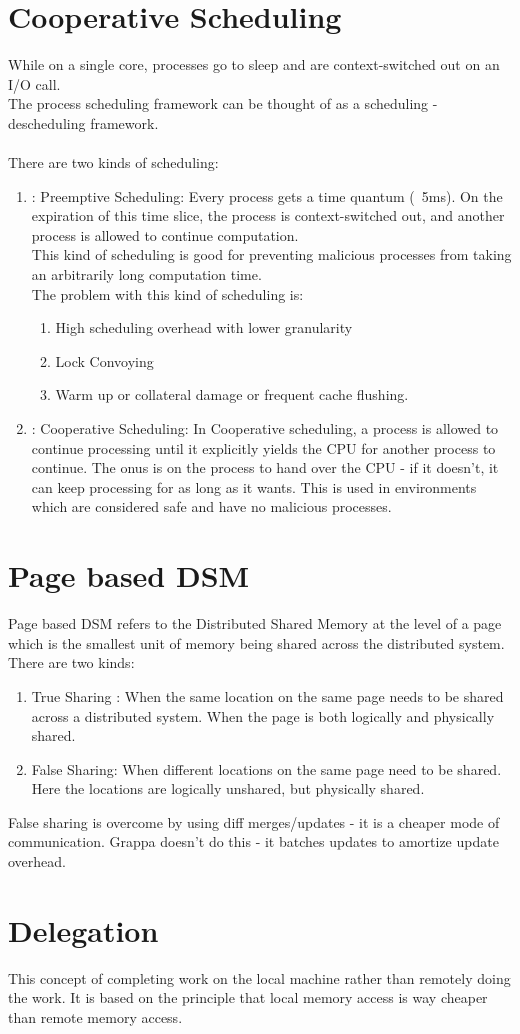 \documentclass[twoside]{article}
\begin{document}
\section{Cooperative Scheduling}
While on a single core, processes go to sleep and are context-switched out on an I/O call. \\
The process scheduling framework can be thought of as a scheduling - descheduling framework. \\ \\
There are two kinds of scheduling:
\begin{enumerate}
\item: Preemptive Scheduling: Every process gets a time quantum (~5ms). On the expiration of this time slice, the process is context-switched out, and another process is allowed to continue computation. \\
This kind of scheduling is good for preventing malicious processes from taking an arbitrarily long computation time. \\
The problem with this kind of scheduling is:
\begin{enumerate}
\item High scheduling overhead with lower granularity
\item Lock Convoying
\item Warm up or collateral damage or frequent cache flushing.
\end{enumerate}
\item: Cooperative Scheduling: In Cooperative scheduling, a process is allowed to continue processing until it explicitly yields the CPU for another process to continue. The onus is on the process to hand over the CPU - if it doesn't, it can keep processing for as long as it wants. This is used in environments which are considered safe and have no malicious processes.
\end{enumerate}

\section{Page based DSM}
Page based DSM refers to the Distributed Shared Memory at the level of a page which is the smallest unit of memory being shared across the distributed system. There are two kinds:
\begin{enumerate}
\item True Sharing : When the same location on the same page needs to be shared across a distributed system. When the page is both logically and physically shared.
\item False Sharing: When different locations on the same page need to be shared. Here the locations are logically unshared, but physically shared.
\end{enumerate}
False sharing is overcome by using diff merges/updates - it is a cheaper mode of communication.
Grappa doesn't do this - it batches updates to amortize update overhead.

\section{Delegation}
This concept of completing work on the local machine rather than remotely doing the work. It is based on the principle that local memory access is way cheaper than remote memory access.
\end{document}
